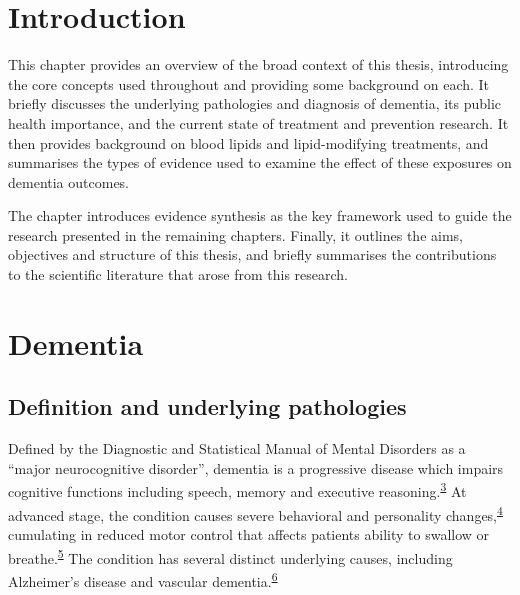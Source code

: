 \documentclass[a4paper, twoside]{templates/ociamthesis}
\begin{document}
\hypertarget{introduction}{%
\section{Introduction}\label{introduction}}

This chapter provides an overview of the broad context of this thesis, introducing the core concepts used throughout and providing some background on each. It briefly discusses the underlying pathologies and diagnosis of dementia, its public health importance, and the current state of treatment and prevention research. It then provides background on blood lipids and lipid-modifying treatments, and summarises the types of evidence used to examine the effect of these exposures on dementia outcomes.

The chapter introduces evidence synthesis as the key framework used to guide the research presented in the remaining chapters. Finally, it outlines the aims, objectives and structure of this thesis, and briefly summarises the contributions to the scientific literature that arose from this research.

\hypertarget{dementia}{%
\section{Dementia}\label{dementia}}

\hypertarget{underlying-pathologies}{%
\subsection{Definition and underlying pathologies}\label{underlying-pathologies}}

Defined by the Diagnostic and Statistical Manual of Mental Disorders as a ``major neurocognitive disorder'', dementia is a progressive disease which impairs cognitive functions including speech, memory and executive reasoning.\textsuperscript{\protect\hyperlink{ref-edition2013}{3}} At advanced stage, the condition causes severe behavioral and personality changes,\textsuperscript{\protect\hyperlink{ref-cerejeira2012}{4}} cumulating in reduced motor control that affects patients ability to swallow or breathe.\textsuperscript{\protect\hyperlink{ref-kumar2013}{5}} The condition has several distinct underlying causes, including Alzheimer's disease and vascular dementia.\textsuperscript{\protect\hyperlink{ref-burns2009}{6}}
\end{document}
